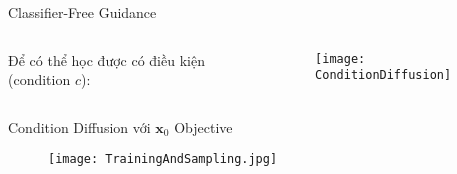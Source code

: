 \begin{frame}{Classifier-Free Guidance}
	\begin{columns}
		\begin{column}{0.5\textwidth}
			Để có thể học được có điều kiện (condition $c$):
%			
			
		\end{column}
		
		\begin{column}{0.5\textwidth}
			\begin{figure}
				\centering
				\texttt{[image: ConditionDiffusion]}
			\end{figure}
		\end{column}
	\end{columns}
	

	
\end{frame}


\begin{frame}{Condition Diffusion với $\mathbf{x}_0$ Objective}
	\begin{figure}
		\centering
		\texttt{[image: TrainingAndSampling.jpg]}
	\end{figure}
\end{frame}




